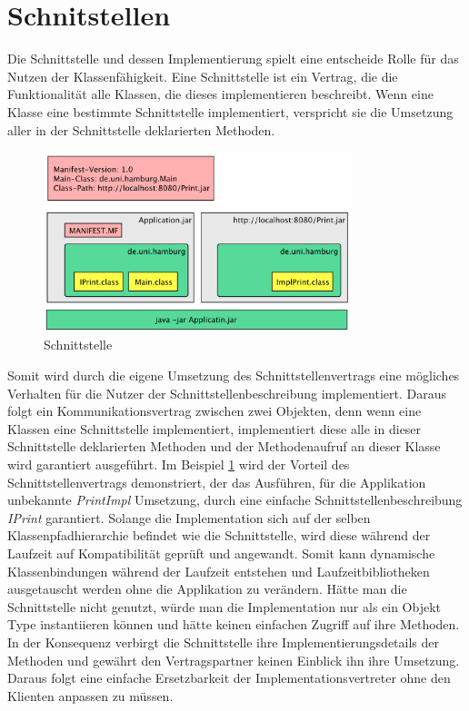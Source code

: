 \section{Schnitstellen} \label{sub:Kapselung}
  Die Schnittstelle und dessen Implementierung spielt eine entscheide Rolle für das Nutzen der Klassenfähigkeit.
  Eine Schnittstelle ist ein Vertrag, die die Funktionalität alle Klassen, die dieses implementieren beschreibt. 
  Wenn eine Klasse eine bestimmte Schnittstelle implementiert, verspricht sie die Umsetzung aller in der Schnittstelle deklarierten Methoden. 
  \begin{figure}[h!]
    \centering
    \includegraphics[width=0.8\textwidth]{material/images/Interface.png}
    \caption{Schnittstelle}
    \label{fig:Schnittstelle}
  \end{figure}
  \newline Somit wird durch die eigene Umsetzung des Schnittstellenvertrags eine mögliches Verhalten für die Nutzer der Schnittstellenbeschreibung implementiert. 
  Daraus folgt ein Kommunikationsvertrag zwischen zwei Objekten, denn wenn eine Klassen eine Schnittstelle implementiert, implementiert diese alle in dieser Schnittstelle deklarierten Methoden und der Methodenaufruf an dieser Klasse wird garantiert ausgeführt. 
  \newline Im Beispiel \ref{fig:Schnittstelle} wird der Vorteil des Schnittstellenvertrags demonstriert, der das Ausführen, für die Applikation unbekannte \textit{PrintImpl} Umsetzung, durch eine einfache Schnittstellenbeschreibung \textit{IPrint} garantiert. Solange die Implementation sich auf der selben Klassenpfadhierarchie befindet wie die Schnittstelle, wird diese während der Laufzeit auf Kompatibilität geprüft und angewandt. Somit kann dynamische Klassenbindungen während der Laufzeit entstehen und Laufzeitbibliotheken ausgetauscht werden ohne die Applikation zu verändern. Hätte man die Schnittstelle nicht genutzt, würde man die Implementation nur als ein Objekt Type instantiieren können und hätte keinen einfachen Zugriff auf ihre Methoden. 
  In der Konsequenz verbirgt die Schnittstelle ihre Implementierungsdetails der Methoden und gewährt den Vertragspartner keinen Einblick ihn ihre Umsetzung. Daraus folgt eine einfache Ersetzbarkeit der Implementationsvertreter ohne den Klienten anpassen zu müssen.  
